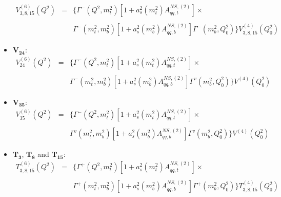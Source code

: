\documentclass[10pt,a4paper]{article}
\begin{document}
\begin{itemize}
\begin{equation}
\begin{array}{rcl}
V^{(6)}_{3,8,15}(Q^2)&=&\displaystyle \Big\{\Gamma^{-}(Q^2,m_t^2)[1+a_s^2(m_t^2)A_{qq,t}^{N\!S,(2)}]\times\\
\\
& & \displaystyle \Gamma^{-}(m_t^2,m_b^2)[1+a_s^2(m_b^2)A_{qq,b}^{N\!S,(2)}]\Gamma^{-}(m_b^2,Q_0^2)\Big\}V^{(4)}_{3,8,15}(Q^2_0)
\end{array}
\end{equation}
\item $\mathbf{V_{24}}$:
\begin{equation}
\begin{array}{rcl}
V^{(6)}_{24}(Q^2)&=&\displaystyle \Big\{\Gamma^{-}(Q^2,m_t^2)[1+a_s^2(m_t^2)A_{qq,t}^{N\!S,(2)}]\times\\
\\
& & \displaystyle \Gamma^{-}(m_t^2,m_b^2)[1+a_s^2(m_b^2)A_{qq,b}^{N\!S,(2)}]\Gamma^{v}(m_b^2,Q_0^2)\Big\}V^{(4)}(Q^2_0)
\end{array}
\end{equation}
\item $\mathbf{V_{35}}$:
\begin{equation}
\begin{array}{rcl}
V^{(6)}_{35}(Q^2)&=&\displaystyle \Big\{\Gamma^{-}(Q^2,m_t^2)[1+a_s^2(m_t^2)A_{qq,t}^{N\!S,(2)}]\times\\
\\
& & \displaystyle \Gamma^{v}(m_t^2,m_b^2)[1+a_s^2(m_b^2)A_{qq,b}^{N\!S,(2)}]\Gamma^{v}(m_b^2,Q_0^2)\Big\}V^{(4)}(Q^2_0)
\end{array}
\end{equation}

\item $\mathbf{T_3}$, $\mathbf{T_8}$ and $\mathbf{T_{15}}$:
\begin{equation}
\begin{array}{rcl}
T^{(6)}_{3,8,15}(Q^2)&=&\displaystyle \Big\{\Gamma^{+}(Q^2,m_t^2)[1+a_s^2(m_t^2)A_{qq,t}^{N\!S,(2)}]\times\\
\\
& & \displaystyle \Gamma^{+}(m_t^2,m_b^2)[1+a_s^2(m_b^2)A_{qq,b}^{N\!S,(2)}]\Gamma^{+}(m_b^2,Q_0^2)\Big\}T^{(4)}_{3,8,15}(Q^2_0)
\end{array}
\end{equation}


\end{itemize}
\end{document}
